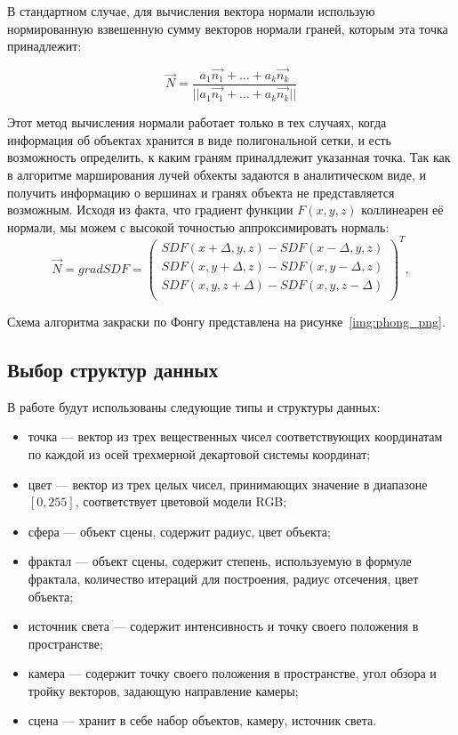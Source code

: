 В стандартном случае, для вычисления вектора нормали использую нормированную взвешенную сумму векторов нормали граней, которым эта точка принадлежит:

\begin{equation}
  \vec{N} = \frac{a_1\vec{n_1}+\dots+a_k\vec{n_k}}{||a_1\vec{n_1}+\dots+a_k\vec{n_k}||}
  \label{eq:normal_std}
\end{equation}

Этот метод вычисления нормали работает только в тех случаях, когда информация об объектах хранится в виде полигональной сетки,
и есть возможность определить, к каким граням приналдлежит указанная точка. Так как в алгоритме марширования лучей
обхекты задаются в аналитическом виде, и получить информацию о вершинах и гранях объекта не представляется возможным.
Исходя из факта, что градиент функции $F(x, y, z)$ коллинеарен её нормали, мы можем с высокой точностью аппроксимировать нормаль:
\begin{equation}
  \vec{N} = grad SDF =
  \left(\begin{array}{c}
      SDF(x + \Delta, y, z) - SDF(x - \Delta, y, z)\\
      SDF(x, y + \Delta, z) - SDF(x, y - \Delta, z)\\
      SDF(x, y, z + \Delta) - SDF(x, y, z - \Delta)\\
    \end{array}\right) ^ T,
  \label{eq:normal_grad}
\end{equation}

Схема алгоритма закраски по Фонгу представлена на рисунке~\ref{img:phong_png}.

\clearpage

\subsection{Выбор структур данных}

В работе будут использованы следующие типы и структуры данных:

\begin{itemize}
	\item точка --- вектор из трех вещественных чисел соответствующих координатам по каждой из осей трехмерной декартовой системы координат;
	\item цвет --- вектор из трех целых чисел, принимающих значение в диапазоне $[0,255]$, соответствует цветовой модели RGB;
	\item сфера --- объект сцены, содержит радиус, цвет объекта;
  \item фрактал --- объект сцены, содержит степень, используемую в формуле фрактала, количество итераций для построения, радиус отсечения, цвет объекта;
	\item источник света --- содержит интенсивность и точку своего положения в пространстве;
	\item камера --- содержит точку своего положения в пространстве, угол обзора и тройку векторов, задающую направление камеры;
	\item сцена --- хранит в себе набор объектов, камеру, источник света.
\end{itemize}

